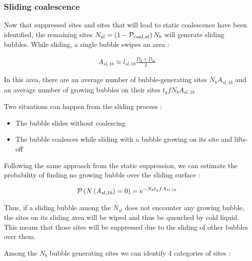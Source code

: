 \subsubsection{Sliding coalescence}

Now that suppressed sites and sites that will lead to static coalescence have been identified, the remaining sites $N_{sl}=\left( 1-\mathcal{P}_{coal,st} \right)N_{b}$ will generate sliding bubbles. While sliding, a single bubble swipes an area :

\begin{align}
A_{sl, 1b} \approx l_{sl,1b}\frac{D_{d}+D_{lo}}{2}
\end{align}

In this area, there are an average number of bubble-generating sites $N_{b}A_{sl,1b}$ and an average number of growing bubbles on their sites $t_{g}f N_{b}A_{sl,1b}$

\npar
Two situations can happen from the sliding process :

\begin{itemize}
\item The bubble slides without coalescing
\item The bubble coalesces while sliding with a bubble growing on its site and lifts-off
\end{itemize}


Following the same approach from the static suppression, we can estimate the probability of finding no growing bubble over the sliding surface : 

\begin{align}
\mathcal{P}\left( N\left( A_{sl,1b} \right)=0  \right)=e^{-N_{b}t_{g}fA_{sl,1b}}
\end{align}

Thus, if a sliding bubble among the $N_{sl}$ does not encounter any growing bubble, the sites on its sliding area will be wiped and thus be quenched by cold liquid. This means that those sites will be suppressed due to the sliding of other bubbles over them.

Among the $N_{b}$ bubble generating sites we can identify 4 categories of sites :

